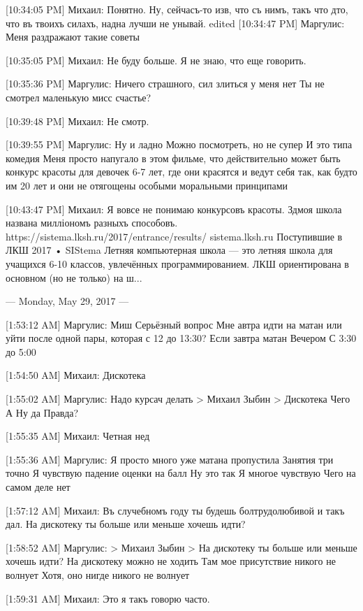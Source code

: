 \documentclass{article}
\newcommand{\yat}{{\fontencoding{X2}\selectfont\cyryat}} %
\begin{document}
{[10:34:05 PM] Михаил:
Понятно. Ну, сейчасъ-то изв, что съ нимъ, такъ что д то, что въ твоихъ силахъ, над на лучш и не унывай.
edited 
[10:34:47 PM] Маргулис:
Меня раздражают такие советы

[10:35:05 PM] Михаил:
Не буду больше.
 Я не знаю, что еще говорить.

[10:35:36 PM] Маргулис:
Ничего страшного, сил злиться у меня нет
 Ты не смотрел маленькую мисс счастье?

[10:39:48 PM] Михаил:
Не смотр.

[10:39:55 PM] Маргулис:
Ну и ладно
 Можно посмотреть, но не супер
 И это типа комедия
 Меня просто напугало в этом фильме, что действительно может быть конкурс красоты для девочек 6-7 лет, где они красятся и ведут себя так, как будто им 20 лет и они не отягощены особыми моральными принципами

[10:43:47 PM] Михаил:
Я вовсе не понимаю конкурсовъ красоты.
 Зд моя школа названа милліономъ разныхъ способовъ. https://sistema.lksh.ru/2017/entrance/results/
sistema.lksh.ru
Поступившие в ЛКШ 2017 • SIStema
Летняя компьютерная школа — это летняя школа для учащихся 6-10 классов, увлечённых программированием. ЛКШ ориентирована в основном (но не только) на ш...

--- Monday, May 29, 2017 ---

[1:53:12 AM] Маргулис:
Миш
 Серьёзный вопрос
 Мне автра идти на матан или уйти после одной пары, которая с 12 до 13:30?
 Если завтра матан
 Вечером
 С 3:30 до 5:00

[1:54:50 AM] Михаил:
Дискотека

[1:55:02 AM] Маргулис:
Надо курсач делать
> Михаил Зыбин
> Дискотека
Чего
 А
 Ну да
 Правда?

[1:55:35 AM] Михаил:
Четная нед

[1:55:36 AM] Маргулис:
Я просто много уже матана пропустила
 Занятия три точно
 Я чувствую падение оценки на балл
 Ну это так
 Я многое чувствую
 Чего на самом деле нет

[1:57:12 AM] Михаил:
Въ сл учебномъ году ты будешь бол трудолюбивой и такъ дал.
 На дискотеку ты больше или меньше хочешь идти?

[1:58:52 AM] Маргулис:
> Михаил Зыбин
> На дискотеку ты больше или меньше хочешь идти?
На дискотеку можно не ходить
 Там мое присутствие никого не волнует
 Хотя, оно нигде никого не волнует

[1:59:31 AM] Михаил:
Это я такъ говорю часто.

}
\end{document}
